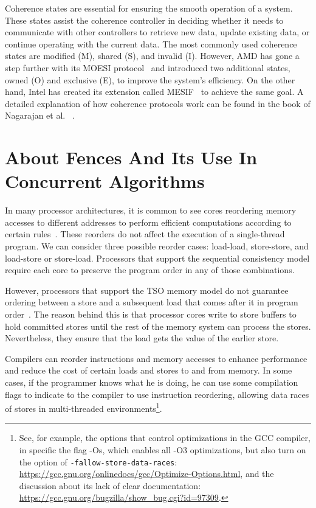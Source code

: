 Coherence states are essential for ensuring the smooth operation of a system. These states assist the coherence controller in deciding whether it needs to communicate with other controllers to retrieve new data, update existing data, or continue operating with the current data. The most commonly used coherence states are modified (M), shared (S), and invalid (I). However, AMD has gone a step further with its MOESI protocol~\cite{devices_amd64} and introduced two additional states, owned (O) and exclusive (E), to improve the system's efficiency. On the other hand, Intel has created its extension called MESIF~\cite{guideintel} to achieve the same goal. A detailed explanation of how coherence protocols work can be found in the book of Nagarajan et al. ~\cite{DBLP_series_synthesis_2020Nagarajan}.

\section{About Fences And Its Use In Concurrent Algorithms}

In many processor architectures, it is common to see cores reordering memory accesses to different addresses to perform efficient computations according to certain rules~\cite{DBLP_series_synthesis_2020Nagarajan}. These reorders do not affect the execution of a single-thread program. We can consider three possible reorder cases: load-load, store-store, and load-store or store-load. Processors that support the sequential consistency model require each core to preserve the program order in any of those combinations.

However, processors that support the TSO memory model do not guarantee ordering between a store and a subsequent load that comes after it in program order~\cite{DBLP_conf_tphol_OwensSS09,DBLP_journals_cacm_SewellSONM10}. The reason behind this is that processor cores write to store buffers to hold committed stores until the rest of the memory system can process the stores. Nevertheless, they ensure that the load gets the value of the earlier store.

Compilers can reorder instructions and memory accesses to enhance performance and reduce the cost of certain loads and stores to and from memory. In some cases, if the programmer knows what he is doing, he can use some compilation flags to indicate to the compiler to use instruction reordering, allowing data races of stores in multi-threaded environments\footnote{See, for example, the options that control optimizations in the GCC compiler, in specific the flag -Os, which enables all -O3 optimizations, but also turn on the option of \texttt{-fallow-store-data-races}: \url{https://gcc.gnu.org/onlinedocs/gcc/Optimize-Options.html}, and the discussion about its lack of clear documentation: \url{https://gcc.gnu.org/bugzilla/show_bug.cgi?id=97309}.}.

